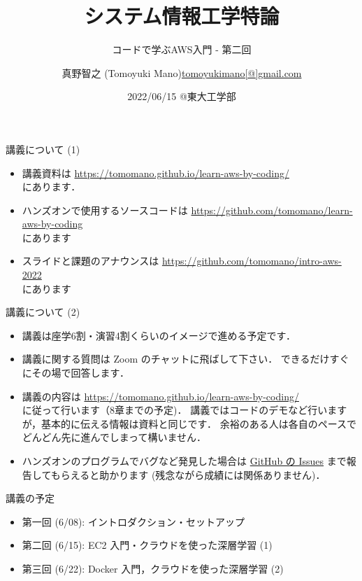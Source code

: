 \documentclass[unicode,11pt]{beamer}
\title{システム情報工学特論}
\subtitle{コードで学ぶAWS入門 - 第二回}
\author[Tomoyuki Mano]{\texorpdfstring{真野智之 (Tomoyuki Mano)\newline\url{tomoyukimano[@]gmail.com}}{Author}}
\institute[OIST]{Okinawa Institute of Science and Technology (OIST)}
\date{2022/06/15 @東大工学部}
\begin{document}
\frame{\titlepage}

\begin{frame}{講義について (1)}
\begin{itemize}
    \item 講義資料は
    \url{https://tomomano.github.io/learn-aws-by-coding/}\\
    にあります．
    \item ハンズオンで使用するソースコードは \url{https://github.com/tomomano/learn-aws-by-coding}\\
    にあります
    \item スライドと課題のアナウンスは
    \url{https://github.com/tomomano/intro-aws-2022}\\
    にあります
\end{itemize}
\end{frame}

\begin{frame}{講義について (2)}
\begin{itemize}
    \item 講義は座学6割・演習4割くらいのイメージで進める予定です．
    \item 講義に関する質問は Zoom のチャットに飛ばして下さい．
    できるだけすぐにその場で回答します．
    \item 講義の内容は
    \url{https://tomomano.github.io/learn-aws-by-coding/}\\
    に従って行います（8章までの予定)．
    講義ではコードのデモなど行いますが，基本的に伝える情報は資料と同じです．
    余裕のある人は各自のペースでどんどん先に進んでしまって構いません．
    \item ハンズオンのプログラムでバグなど発見した場合は
    \href{https://github.com/tomomano/learn-aws-by-coding/issues}{GitHub の Issues}
    まで報告してもらえると助かります (残念ながら成績には関係ありません)．
\end{itemize}

\end{frame}

\begin{frame}{講義の予定}
    \begin{itemize}
        \item 第一回 (6/08): イントロダクション・セットアップ
        \item 第二回 (6/15): EC2 入門・クラウドを使った深層学習 (1)
        \item 第三回 (6/22): Docker 入門，クラウドを使った深層学習 (2)
    \end{itemize}
\end{frame}
\end{document}
